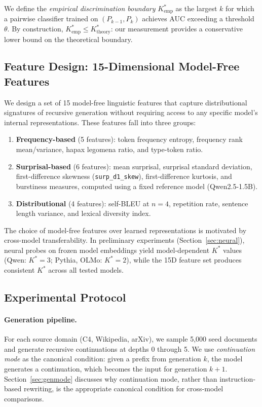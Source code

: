\documentclass[11pt,a4paper]{article}
\begin{document}
We define the \emph{empirical discrimination boundary} $K^*_{\text{emp}}$ as the largest $k$ for which a pairwise classifier trained on $(P_{k-1}, P_k)$ achieves AUC exceeding a threshold $\theta$. By construction, $K^*_{\text{emp}} \le K^*_{\text{theory}}$: our measurement provides a conservative lower bound on the theoretical boundary.

\subsection{Feature Design: 15-Dimensional Model-Free Features}
\label{sec:features}

We design a set of 15 model-free linguistic features that capture distributional signatures of recursive generation without requiring access to any specific model's internal representations. These features fall into three groups:

\begin{enumerate}
    \item \textbf{Frequency-based} (5 features): token frequency entropy, frequency rank mean/variance, hapax legomena ratio, and type-token ratio.
    \item \textbf{Surprisal-based} (6 features): mean surprisal, surprisal standard deviation, first-difference skewness (\texttt{surp\_d1\_skew}), first-difference kurtosis, and burstiness measures, computed using a fixed reference model (Qwen2.5-1.5B).
    \item \textbf{Distributional} (4 features): self-BLEU at $n\!=\!4$, repetition rate, sentence length variance, and lexical diversity index.
\end{enumerate}

The choice of model-free features over learned representations is motivated by cross-model transferability. In preliminary experiments (Section~\ref{sec:neural}), neural probes on frozen model embeddings yield model-dependent $K^*$ values (Qwen: $K^*\!=\!3$; Pythia, OLMo: $K^*\!=\!2$), while the 15D feature set produces consistent $K^*$ across all tested models.

\subsection{Experimental Protocol}
\label{sec:protocol}

\paragraph{Generation pipeline.} For each source domain (C4, Wikipedia, arXiv), we sample 5{,}000 seed documents and generate recursive continuations at depths 0 through 5. We use \emph{continuation mode} as the canonical condition: given a prefix from generation $k$, the model generates a continuation, which becomes the input for generation $k+1$. Section~\ref{sec:genmode} discusses why continuation mode, rather than instruction-based rewriting, is the appropriate canonical condition for cross-model comparisons.
\end{document}

